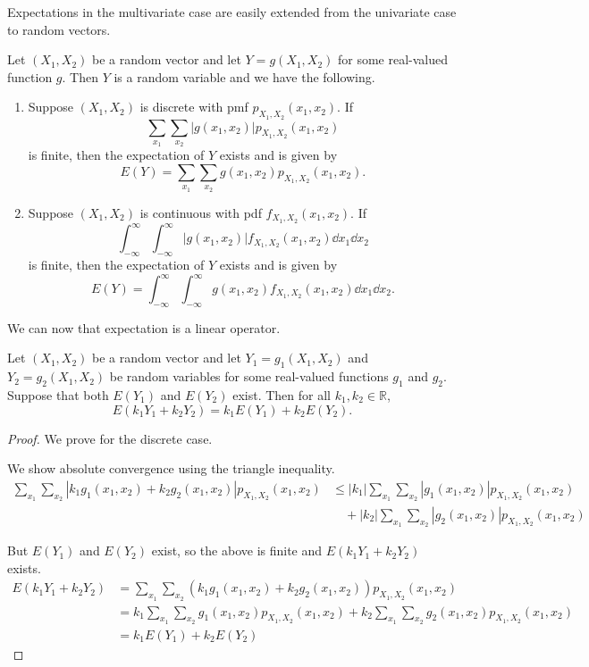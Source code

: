 Expectations in the multivariate case are easily extended from the univariate case to random vectors.

\begin{theorem}
	Let $(X_1,X_2)$ be a random vector and let $Y=g(X_1,X_2)$ for some real-valued function $g$. Then $Y$ is a random variable and we have the following.
	\begin{enumerate}[label=\color{main}(\alph*)]
		\item Suppose $(X_1,X_2)$ is discrete with pmf $p_{X_1,X_2}(x_1,x_2)$. If $$\sum_{x_1}\sum_{x_2}|g(x_1,x_2)|p_{X_1,X_2}(x_1,x_2)$$ is finite, then the expectation of $Y$ exists and is given by $$E(Y)=\sum_{x_1}\sum_{x_2}g(x_1,x_2)p_{X_1,X_2}(x_1,x_2).$$
		\item Suppose $(X_1,X_2)$ is continuous with pdf $f_{X_1,X_2}(x_1,x_2)$. If $$\int_{-\infty}^{\infty}\int_{-\infty}^{\infty}|g(x_1,x_2)|f_{X_1,X_2}(x_1,x_2)\dd{x_1}\dd{x_2}$$ is finite, then the expectation of $Y$ exists and is given by $$E(Y)=\int_{-\infty}^{\infty}\int_{-\infty}^{\infty}g(x_1,x_2)f_{X_1,X_2}(x_1,x_2)\dd{x_1}\dd{x_2}.$$
	\end{enumerate}
\end{theorem}

We can now that expectation is a linear operator.

\begin{theorem}
	Let $(X_1,X_2)$ be a random vector and let $Y_1=g_1(X_1,X_2)$ and $Y_2=g_2(X_1,X_2)$ be random variables for some real-valued functions $g_1$ and $g_2$. Suppose that both $E(Y_1)$ and $E(Y_2)$ exist. Then for all $k_1,k_2\in\mathbb R$,
	$$E(k_1Y_1+k_2Y_2)=k_1E(Y_1)+k_2E(Y_2).$$
\end{theorem}

\begin{proof}
	We prove for the discrete case.

	We show absolute convergence using the triangle inequality.
	\begin{align*}
		\sum_{x_1}\sum_{x_2}|k_1g_1(x_1,x_2)+k_2g_2(x_1,x_2)|p_{X_1,X_2}(x_1,x_2)&\leq |k_1|\sum_{x_1}\sum_{x_2}|g_1(x_1,x_2)|p_{X_1,X_2}(x_1,x_2)\\
		&\quad+|k_2|\sum_{x_1}\sum_{x_2}|g_2(x_1,x_2)|p_{X_1,X_2}(x_1,x_2)
	\end{align*}

	But $E(Y_1)$ and $E(Y_2)$ exist, so the above is finite and $E(k_1Y_1+k_2Y_2)$ exists.
	\begin{align*}
		E(k_1Y_1+k_2Y_2)&=\sum_{x_1}\sum_{x_2}(k_1g_1(x_1,x_2)+k_2g_2(x_1,x_2))p_{X_1,X_2}(x_1,x_2)\\
		&=k_1\sum_{x_1}\sum_{x_2}g_1(x_1,x_2)p_{X_1,X_2}(x_1,x_2)+k_2\sum_{x_1}\sum_{x_2}g_2(x_1,x_2)p_{X_1,X_2}(x_1,x_2)\\
		&=k_1E(Y_1)+k_2E(Y_2)
	\end{align*}
\end{proof}
